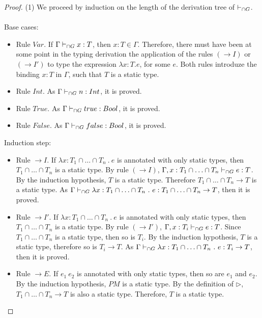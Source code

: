 \documentclass[a4paper]{article}
\begin{document}
\begin{proof}
(1) We proceed by induction on the length of the derivation tree of $\vdash_{\cap G}$.\\\\
Base cases:
\begin{itemize}
    \item Rule $Var$.
    If $\Gamma \vdash_{\cap G} x : T$, then $x : T \in \Gamma$.
    Therefore, there must have been at some point in the typing derivation the application of the rules $({\rightarrow} I)$ or $({\rightarrow} I')$ to type the expression $\lambda x : T . e$, for some $e$.
    Both rules introduze the binding $x : T$ in $\Gamma$, such that $T$ is a static type.
    \item Rule $Int$.
    As $\Gamma \vdash_{\cap G} n : {Int}$, it is proved.
    \item Rule $True$.
    As $\Gamma \vdash_{\cap G} true : Bool$, it is proved.
    \item Rule $False$.
    As $\Gamma \vdash_{\cap G} false : Bool$, it is proved.
\end{itemize}
Induction step:
\begin{itemize}
    \item Rule ${\rightarrow} I$.
    If $\lambda x : T_1 \cap \ldots \cap T_n\ .\ e$ is annotated with only static types, then $T_1 \cap \ldots \cap T_n$ is a static type.
    By rule $({\rightarrow} I)$, $\Gamma, x : T_1 \cap \ldots \cap T_n \vdash_{\cap G} e : T$.
    By the induction hypothesis, $T$ is a static type.
    Therefore $T_1 \cap \ldots \cap T_n \rightarrow T$ is a static type.
    As $\Gamma \vdash_{\cap G} \lambda x : T_1 \cap \ldots \cap T_n\ .\ e : T_1 \cap \ldots \cap T_n \rightarrow T$, then it is proved.
    \item Rule ${\rightarrow} I'$.
    If $\lambda x : T_1 \cap \ldots \cap T_n\ .\ e$ is annotated with only static types, then $T_1 \cap \ldots \cap T_n$ is a static type.
    By rule $({\rightarrow} I')$, $\Gamma, x : T_i \vdash_{\cap G} e : T$.
    Since $T_1 \cap \ldots \cap T_n$ is a static type, then so is $T_i$.
    By the induction hypothesis, $T$ is a static type, therefore so is $T_i \rightarrow T$.
    As $\Gamma \vdash_{\cap G} \lambda x : T_1 \cap \ldots \cap T_n\ .\ e : T_i \rightarrow T$, then it is proved.
    \item Rule ${\rightarrow} E$.
    If $e_1\ e_2$ is annotated with only static types, then so are $e_1$ and $e_2$.
    By the induction hypothesis, $PM$ is a static type.
    By the definition of $\rhd$, $T_1 \cap \ldots \cap T_n \rightarrow T$ is also a static type.
    Therefore, $T$ is a static type.

\end{itemize}
\end{proof}
\end{document}
